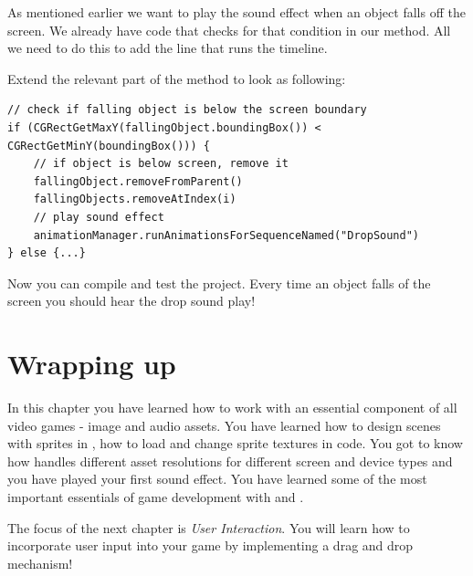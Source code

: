 As mentioned earlier we want to play the sound effect when an object falls off
the screen. We already have code that checks for that condition in our
 method. All we need to do this to add the line that runs the
timeline. 

\begin{leftbar}
Extend the relevant part of the  method to look as
following:
\begin{lstlisting}
// check if falling object is below the screen boundary
if (CGRectGetMaxY(fallingObject.boundingBox()) < CGRectGetMinY(boundingBox())) {
	// if object is below screen, remove it
    fallingObject.removeFromParent()
    fallingObjects.removeAtIndex(i)
    // play sound effect
    animationManager.runAnimationsForSequenceNamed("DropSound")
} else {...}
\end{lstlisting}
\end{leftbar}

Now you can compile and test the project. Every time an object falls of the
screen you should hear the drop sound play!

\section{Wrapping up}
In this chapter you have learned how to work with an essential component of all
video games - image and audio assets. You have learned how to design scenes with
sprites in \SB{}, how to load and change sprite textures in code. You got to
know how \SB{} handles different asset resolutions for different screen and
device types and you have played your first sound effect. You have learned some
of the most important essentials of game development with \SB{} and \cocos{}.

The focus of the next chapter is \textit{User Interaction}. You will learn how
to incorporate user input into your game by implementing a drag and drop
mechanism!